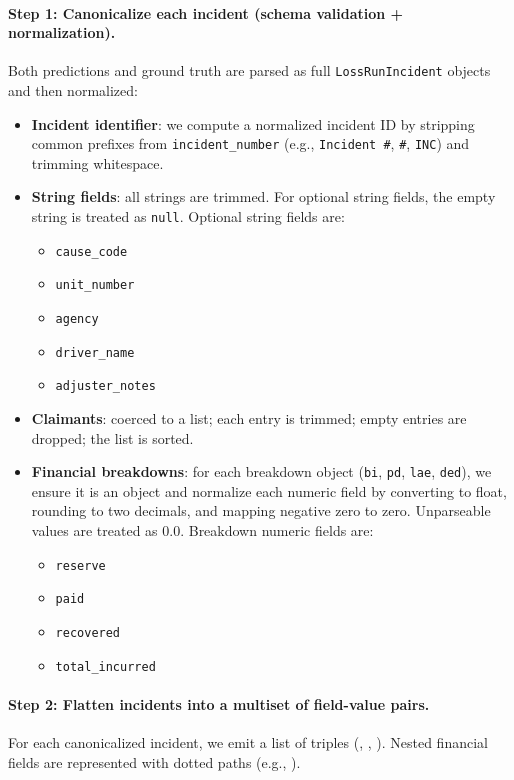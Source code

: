 \paragraph{Step 1: Canonicalize each incident (schema validation + normalization).}
Both predictions and ground truth are parsed as full \texttt{LossRunIncident} objects and then normalized:
\begin{itemize}
    \item \textbf{Incident identifier}: we compute a normalized incident ID by stripping common prefixes from \texttt{incident\_number} (e.g., \texttt{Incident \#}, \texttt{\#}, \texttt{INC}) and trimming whitespace.
    \item \textbf{String fields}: all strings are trimmed. For optional string fields, the empty string is treated as \texttt{null}. Optional string fields are:
    \begin{itemize}
        \item \texttt{cause\_code}
        \item \texttt{unit\_number}
        \item \texttt{agency}
        \item \texttt{driver\_name}
        \item \texttt{adjuster\_notes}
    \end{itemize}
    \item \textbf{Claimants}: coerced to a list; each entry is trimmed; empty entries are dropped; the list is sorted.
    \item \textbf{Financial breakdowns}: for each breakdown object (\texttt{bi}, \texttt{pd}, \texttt{lae}, \texttt{ded}), we ensure it is an object and normalize each numeric field by converting to float, rounding to two decimals, and mapping negative zero to zero. Unparseable values are treated as 0.0. Breakdown numeric fields are:
    \begin{itemize}
        \item \texttt{reserve}
        \item \texttt{paid}
        \item \texttt{recovered}
        \item \texttt{total\_incurred}
    \end{itemize}
\end{itemize}

\paragraph{Step 2: Flatten incidents into a multiset of field-value pairs.}
For each canonicalized incident, we emit a list of triples (, , ). Nested financial fields are represented with dotted paths (e.g., ).

